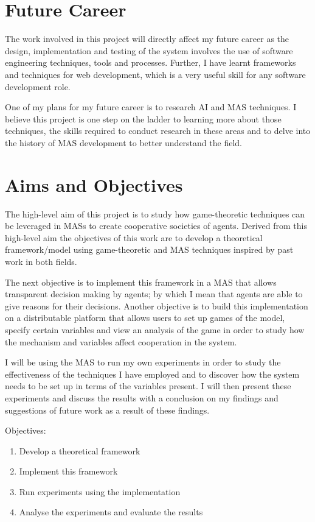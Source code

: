\documentclass[]{final_report}
\begin{document}
\section{Future Career}
The work involved in this project will directly affect my future career as the design, implementation and testing of the system involves the use of software engineering techniques, tools and processes. Further, I have learnt frameworks and techniques for web development, which is a very useful skill for any software development role.\par 
One of my plans for my future career is to research AI and MAS techniques. I believe this project is one step on the ladder to learning more about those techniques, the skills required to conduct research in these areas and to delve into the history of MAS development to better understand the field.

\section{Aims and Objectives}
\label{sec:aao}
The high-level aim of this project is to study how game-theoretic techniques can be leveraged in MASs to create cooperative societies of agents. Derived from this high-level aim the objectives of this work are to develop a theoretical framework/model using game-theoretic and MAS techniques inspired by past work in both fields.\par 
The next objective is to implement this framework in a MAS that allows transparent decision making by agents; by which I mean that agents are able to give reasons for their decisions. Another objective is to build this implementation on a distributable platform that allows users to set up games of the model, specify certain variables and view an analysis of the game in order to study how the mechanism and variables affect cooperation in the system.\par
I will be using the MAS to run my own experiments in order to study the effectiveness of the techniques I have employed and to discover how the system needs to be set up in terms of the variables present. I will then present these experiments and discuss the results with a conclusion on my findings and suggestions of future work as a result of these findings.\par
Objectives:
\begin{enumerate}
	\item Develop a theoretical framework
	\item Implement this framework
	\item Run experiments using the implementation
	\item Analyse the experiments and evaluate the results
\end{enumerate}
\end{document}
